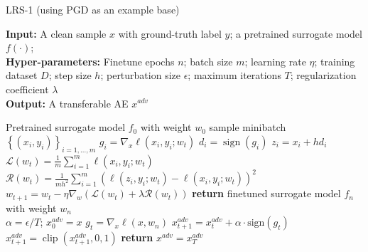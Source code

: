 \documentclass[letterpaper]{article} %
\theoremstyle{plain}
\theoremstyle{definition}
\begin{document}
\begin{algorithm}[t]
\caption{LRS-1 (using PGD as an example base)}
\label{alg}
\begin{flushleft}
    \textbf{Input:} A clean sample $x$ with ground-truth label $y$; a pretrained surrogate model $f(\cdot)$;\\
    \textbf{Hyper-parameters:} Finetune epochs $n$; batch size $m$; learning rate $\eta$; training dataset $D$; step size $h$; perturbation size $\epsilon$; maximum iterations $T$;  regularization coefficient $\lambda$\\
    \textbf{Output:} A transferable AE $x^{adv}$
\end{flushleft}
\begin{algorithmic}[1]
    \State Pretrained surrogate model $f_0$ with weight $w_0$
        \State sample minibatch $\left\{\left(x_{i}, y_{i}\right)\right\}_{i=1, \ldots, m}$
        \State $g_{i}=\nabla_x \ell\left(x_{i}, y_{i} ; w_t\right)$
        \State $d_{i}=\operatorname{sign}(g_{i})$
        \State $z_{i}=x_{i}+h d_{i}$
        \State $\mathcal{L}(w_t)=\frac{1}{m} \sum_{i=1}^m \ell\left(x_i, y_i ; w_t\right)$
        \State $\mathcal{R}(w_t)=\frac{1}{mh^2} \sum_{i=1}^m \left(\ell\left(z_i, y_i ; w_t\right)-\ell\left(x_i, y_i ; w_t\right)\right)^2$
        \State $w_{t+1} = w_t-\eta \nabla_w\left(\mathcal{L}\left(w_t\right)+\lambda \mathcal{R}\left(w_t\right)\right)$
    \EndFor
    \EndFor
    \State \textbf{return} finetuned surrogate model $f_n$ with weight $w_n$
    \vspace{-8mm}
    \[\]
    \State $\alpha=\epsilon/T$; $x_{0}^{adv}=x$
        \State $g_t=\nabla_{x} \ell(x, w_n)$
        \State $x_{t+1}^{adv} = x_t^{adv} + \alpha \cdot \text{sign}(g_{t})$
        \State $x_{t+1}^{adv} = \operatorname{clip}\left(x_{t+1}^{adv}, 0,1\right)$
    \EndFor
    \State \textbf{return} $x^{adv}=x_{T}^{adv}$
\end{algorithmic}

\end{algorithm}
\end{document}

